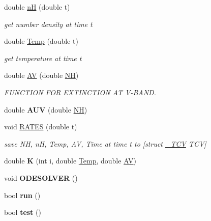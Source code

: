 \begin{DoxyCompactItemize}
\mbox{\label{classUModel_abb8f2d7fad8a36fd3154829b6ea8da5b}} 
double \hyperlink{classUModel_abb8f2d7fad8a36fd3154829b6ea8da5b}{nH} (double t)
\begin{DoxyCompactList}\small\item\em get number density at time t \end{DoxyCompactList}\item 
\mbox{\label{classUModel_a700259282a9a3b6017097ec8612c82cc}} 
double \hyperlink{classUModel_a700259282a9a3b6017097ec8612c82cc}{Temp} (double t)
\begin{DoxyCompactList}\small\item\em get temperature at time t \end{DoxyCompactList}\item 
\mbox{\label{classUModel_ae2f9952ad7412ee143bf81c65f0db76f}} 
double \hyperlink{classUModel_ae2f9952ad7412ee143bf81c65f0db76f}{AV} (double \hyperlink{classUModel_a060609ed8911e53450beda9cefdb6240}{NH})
\begin{DoxyCompactList}\small\item\em F\+U\+N\+C\+T\+I\+ON F\+OR E\+X\+T\+I\+N\+C\+T\+I\+ON AT V-\/\+B\+A\+ND. \end{DoxyCompactList}\item 
\mbox{\label{classUModel_a4deca05a74cc3d12049089c1bf028c89}} 
double {\bfseries A\+UV} (double \hyperlink{classUModel_a060609ed8911e53450beda9cefdb6240}{NH})
\item 
\mbox{\label{classUModel_a4d49e9a28edb5d0aea7366db053a233d}} 
void \hyperlink{classUModel_a4d49e9a28edb5d0aea7366db053a233d}{R\+A\+T\+ES} (double t)
\begin{DoxyCompactList}\small\item\em save NH, nH, Temp, AV, Time at time t to \mbox{[}struct \hyperlink{structUModel_1_1__TCV}{\+\_\+\+T\+CV} T\+CV\mbox{]} \end{DoxyCompactList}\item 
\mbox{\label{classUModel_a5671676f8fd3c44639c8f373bd5b006b}} 
double {\bfseries K} (int i, double \hyperlink{classUModel_a700259282a9a3b6017097ec8612c82cc}{Temp}, double \hyperlink{classUModel_ae2f9952ad7412ee143bf81c65f0db76f}{AV})
\item 
\mbox{\label{classUModel_a8ba1800cd07a59ae888d1d31d41e03c4}} 
void {\bfseries O\+D\+E\+S\+O\+L\+V\+ER} ()
\item 
\mbox{\label{classUModel_a2d3999e57e67fdd956e600d56fc42eb2}} 
bool {\bfseries run} ()
\item 
\mbox{\label{classUModel_ad5cc4202506cb672dd1a008a8915965a}} 
bool {\bfseries test} ()
\end{DoxyCompactItemize}
